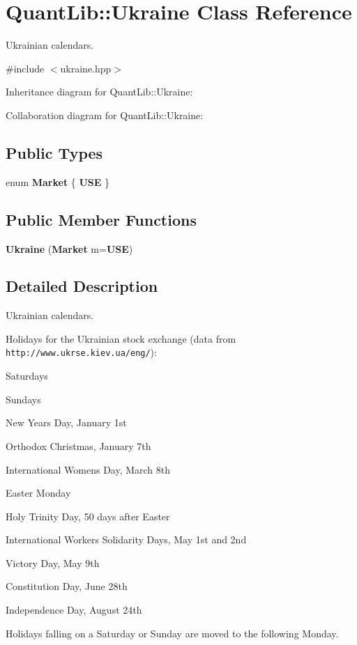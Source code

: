 \section{Quant\+Lib\+:\+:Ukraine Class Reference}
\label{class_quant_lib_1_1_ukraine}


Ukrainian calendars.  




{\ttfamily \#include $<$ukraine.\+hpp$>$}



Inheritance diagram for Quant\+Lib\+:\+:Ukraine\+:


Collaboration diagram for Quant\+Lib\+:\+:Ukraine\+:
\subsection*{Public Types}
\begin{DoxyCompactItemize}
\item 
enum {\bf Market} \{ {\bf U\+SE}
 \}
\end{DoxyCompactItemize}
\subsection*{Public Member Functions}
\begin{DoxyCompactItemize}
\item 
{\bf Ukraine} ({\bf Market} m={\bf U\+SE})
\end{DoxyCompactItemize}


\subsection{Detailed Description}
Ukrainian calendars. 

Holidays for the Ukrainian stock exchange (data from {\tt http\+://www.\+ukrse.\+kiev.\+ua/eng/})\+: 
\begin{DoxyItemize}
\item Saturdays 
\item Sundays 
\item New Year\textquotesingle{}s Day, January 1st 
\item Orthodox Christmas, January 7th 
\item International Women\textquotesingle{}s Day, March 8th 
\item Easter Monday 
\item Holy Trinity Day, 50 days after Easter 
\item International Workers\textquotesingle{} Solidarity Days, May 1st and 2nd 
\item Victory Day, May 9th 
\item Constitution Day, June 28th 
\item Independence Day, August 24th 
\end{DoxyItemize}Holidays falling on a Saturday or Sunday are moved to the following Monday. 

